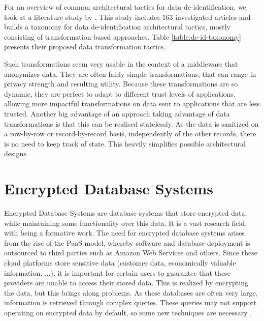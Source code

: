 For an overview of common architectural tactics for data de-identification, we look at a literature study by \citeauthor{de-id-taxonomy}. This study includes 163 investigated articles and builds a taxonomy for data de-identification architectural tactics, mostly consisting of transformation-based approaches. Table \ref{table:de-id-taxonomy} presents their proposed data transformation tactics.

Such transformations seem very usable in the context of a middleware that anonymizes data. They are often fairly simple transformations, that can range in privacy strength and resulting utility. Because these transformations are so dynamic, they are perfect to adapt to different trust levels of applications, allowing more impactful transformations on data sent to applications that are less trusted. Another big advantage of an approach taking advantage of data transformations is that this can be realised statelessly. As the data is sanitized on a row-by-row or record-by-record basis, independently of the other records, there is no need to keep track of state. This heavily simplifies possible architectural designs.
\newpage


\section{Encrypted Database Systems}
\label{sec:enc-db}
\noindent Encrypted Database Systems are database systems that store encrypted data, while maintaining some functionality over this data. It is a vast research field, with \citet{sok-cryptdb} being a formative work. The need for encrypted database systems arises from the rise of the PaaS model, whereby software and database deployment is outsourced to third parties such as Amazon Web Services and others. Since these cloud platforms store sensitive data (customer data, economically valuable information, ...), it is important for certain users to guarantee that these providers are unable to access their stored data. This is realized by encrypting the data, but this brings along problems. As these databases are often very large, information is retrieved through complex queries. These queries may not support operating on encrypted data by default, so some new techniques are necessary \citep{datablinder}. 

